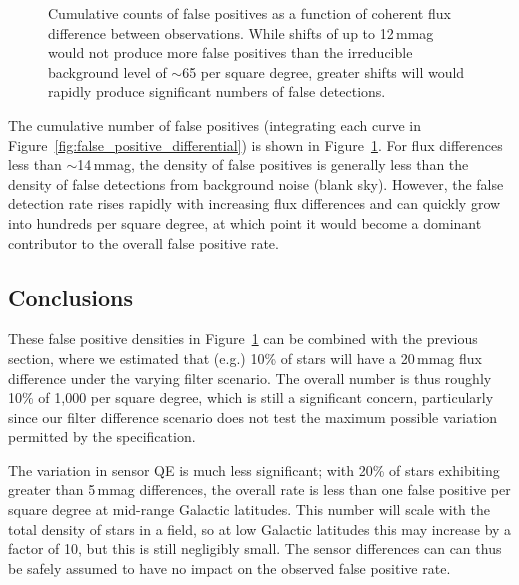 \documentclass[DM,toc]{lsstdoc}
\begin{document}
\begin{figure}
\caption{Cumulative counts of false positives as a function of coherent flux
difference between observations. While shifts of up to 12\,mmag would not produce
more false positives than the irreducible background level of $\sim$65 per
square degree, greater shifts will would rapidly produce significant numbers of
false detections.
\label{fig:fp_vs_flux_shift}}
\end{figure}

The cumulative number of false positives (integrating each curve in
Figure~\ref{fig:false_positive_differential}) is shown in
Figure~\ref{fig:fp_vs_flux_shift}. For flux differences less than $\sim$14\,mmag,
the density of false positives is generally less than the density of false
detections from background noise (blank sky). However, the false detection rate
rises rapidly with increasing flux differences and can quickly grow into
hundreds per square degree, at which point it would become a dominant
contributor to the overall false positive rate.

\subsection{Conclusions}

These false positive densities in Figure~\ref{fig:fp_vs_flux_shift} can be combined
with the previous section, where we estimated that (e.g.) 10\% of stars
will have a 20\,mmag flux difference under the varying filter scenario. The
overall number is thus roughly 10\% of 1,000 per square degree, which is still a
significant concern, particularly since our filter difference scenario does not
test the maximum possible variation permitted by the specification.

The variation in sensor QE is much less significant; with 20\% of stars
exhibiting greater than 5\,mmag differences, the overall rate is less than one
false positive per square degree at mid-range Galactic latitudes. This number
will scale with the total density of stars in a field, so at low Galactic
latitudes this may increase by a factor of 10, but this is still negligibly
small. The sensor differences can can thus be safely assumed to have no impact
on the observed false positive rate.


\end{document}
